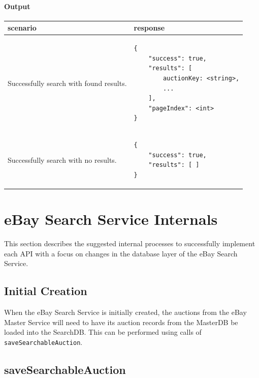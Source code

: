 \documentclass[12pt,a4paper]{article}
\begin{document}
\paragraph{Output}
\begin{center}
    \begin{tabular}{| p{7cm} | l |}
        \hline
        \textbf{scenario} & \textbf{response} \\
        \hline
        Successfully search with found results. &
        \begin{lstlisting}[language=tablejson,firstnumber=1]
{
    "success": true,
    "results": [ 
        auctionKey: <string>,
        ...
    ],
    "pageIndex": <int>
}
        \end{lstlisting} \\ 
        \hline
 \hline
        Successfully search with no results. &
        \begin{lstlisting}[language=tablejson,firstnumber=1]
{
    "success": true,
    "results": [ ]
}
         \end{lstlisting} \\ 
         \hline
    \end{tabular}
\end{center}

\pagebreak
\section{eBay Search Service Internals}

This section describes the suggested internal processes to successfully implement each API with a focus on changes in the database layer of the eBay Search Service.


\subsection{Initial Creation}

When the eBay Search Service is initially created, the auctions from 
the eBay Master Service will need to have its auction records from the MasterDB
be loaded into the SearchDB. This can be performed using calls of \texttt{saveSearchableAuction}.

\subsection{saveSearchableAuction}
\end{document}
